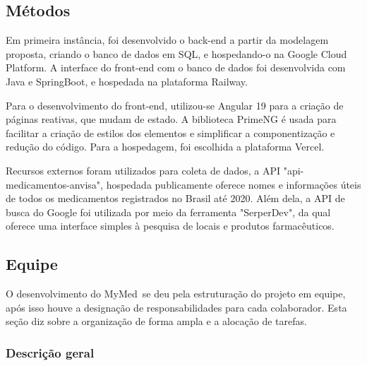 \documentclass[
	article,			%
	12pt,				%
	oneside,			%
	a4paper,			%
    BIBLATEX,           %
	english,			%
	brazil,				%
	sumario=tradicional
	]{abntex2}
\newcommand\nomeprojeto{MyMed}
\begin{document}
\subsection{Métodos}

Em primeira instância, foi desenvolvido o back-end a partir da modelagem proposta, criando o banco de dados em SQL, e hospedando-o na Google Cloud Platform. A interface do front-end com o banco de dados foi desenvolvida com Java e SpringBoot, e hospedada na plataforma Railway.

Para o desenvolvimento do front-end, utilizou-se Angular 19 para a criação de páginas reativas, que mudam de estado. A biblioteca PrimeNG é usada para facilitar a criação de estilos dos elementos e simplificar a componentização e redução do código. Para a hospedagem, foi escolhida a plataforma Vercel.

Recursos externos foram utilizados para coleta de dados, a API "api-medicamentos-anvisa", hospedada publicamente oferece nomes e informações úteis de todos os medicamentos registrados no Brasil até 2020. Além dela, a API de busca do Google foi utilizada por meio da ferramenta "SerperDev", da qual oferece uma interface simples à pesquisa de locais e produtos farmacêuticos.




\subsection{Equipe}

O desenvolvimento do \nomeprojeto\ se deu pela estruturação do projeto em equipe, após isso houve a designação de responsabilidades para cada colaborador. Esta seção diz sobre a organização de forma ampla e a alocação de tarefas.

\subsubsection{Descrição geral}
\end{document}

